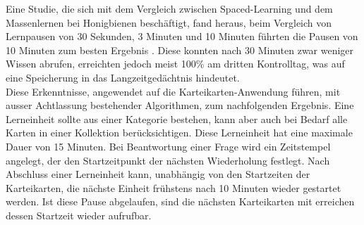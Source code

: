 Eine Studie, die sich mit dem Vergleich zwischen Spaced-Learning und dem Massenlernen bei Honigbienen beschäftigt, fand heraus, beim Vergleich von Lernpausen von 30 Sekunden, 3 Minuten und 10 Minuten führten die Pausen von 10 Minuten zum besten Ergebnis \cite{Menzel.2001}. Diese konnten nach 30 Minuten zwar weniger Wissen abrufen, erreichten jedoch meist 100{\%} am dritten Kontrolltag, was auf eine Speicherung in das Langzeitgedächtnis hindeutet. \\

Diese Erkenntnisse, angewendet auf die Karteikarten-Anwendung führen, mit ausser Achtlassung bestehender Algorithmen, zum nachfolgenden Ergebnis. Eine Lerneinheit sollte aus einer Kategorie bestehen, kann aber auch bei Bedarf alle Karten in einer Kollektion berücksichtigen. Diese Lerneinheit hat eine maximale Dauer von 15 Minuten. Bei Beantwortung einer Frage wird ein Zeitstempel angelegt, der den Startzeitpunkt der nächsten Wiederholung festlegt. Nach Abschluss einer Lerneinheit kann, unabhängig von den Startzeiten der Karteikarten, die nächste Einheit frühstens nach 10 Minuten wieder gestartet werden. Ist diese Pause abgelaufen, sind die nächsten Karteikarten mit erreichen dessen Startzeit wieder aufrufbar.








